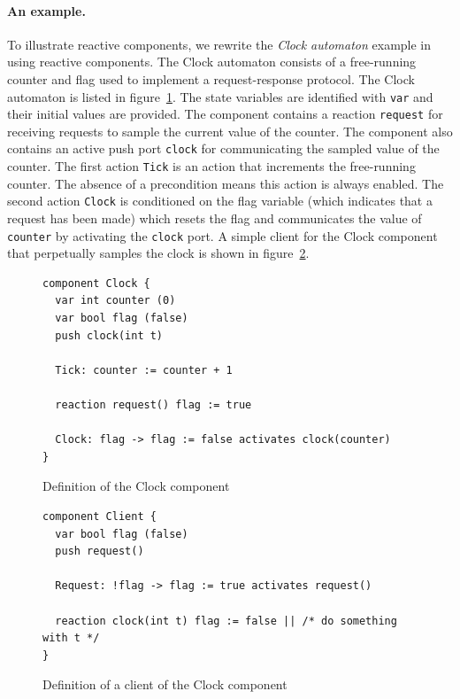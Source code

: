 \paragraph{An example.}
To illustrate reactive components, we rewrite the \emph{Clock automaton} example in ~\cite{nancy1996distributed} using reactive components.
The Clock automaton consists of a free-running counter and flag used to implement a request-response protocol.
The Clock automaton is listed in figure~\ref{clock_component}.
The state variables are identified with \verb+var+ and their initial values are provided.
The component contains a reaction \verb+request+ for receiving requests to sample the current value of the counter.
The component also contains an active push port \verb+clock+ for communicating the sampled value of the counter.
The first action \verb+Tick+ is an action that increments the free-running counter.
The absence of a precondition means this action is always enabled.
The second action \verb+Clock+ is conditioned on the flag variable (which indicates that a request has been made) which resets the flag and communicates the value of \verb+counter+ by activating the \verb+clock+ port.
A simple client for the Clock component that perpetually samples the clock is shown in figure~\ref{client_component}.

\begin{figure}
\begin{verbatim}
component Clock {
  var int counter (0)
  var bool flag (false)
  push clock(int t)

  Tick: counter := counter + 1

  reaction request() flag := true

  Clock: flag -> flag := false activates clock(counter)
}
\end{verbatim}
\caption{Definition of the Clock component\label{clock_component}}
\end{figure}

\begin{figure}
\begin{verbatim}
component Client {
  var bool flag (false)
  push request()

  Request: !flag -> flag := true activates request()

  reaction clock(int t) flag := false || /* do something with t */
}
\end{verbatim}
\caption{Definition of a client of the Clock component\label{client_component}}
\end{figure}

